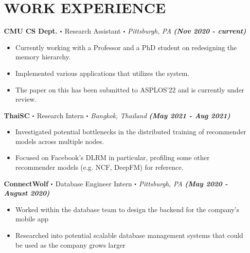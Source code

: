 \documentclass[10pt]{article}
\newcommand\sbullet[1][.5]{\mathbin{\vcenter{\hbox{\scalebox{#1}{$\bullet$}}}}}
\begin{document}
  \section*{\large \textcolor{lighterB} {WORK EXPERIENCE}}
  \vspace*{-0.23cm}

  \textbf{\large CMU CS Dept. $\sbullet$} {\large Research Assistant $\sbullet$ \textit{Pittsburgh, PA} \hfill \textit{\textbf{(Nov 2020 - current)}}}

  \vspace*{-0.2cm}
  \begin{itemize}
    \itemsep-0.4em
    \item \textcolor{lighterG}{Currently working with a Professor and a PhD student on redesigning the memory hierarchy.}
    \item \textcolor{lighterG}{Implemented various applications that utilizes the system.}
    \item \textcolor{lighterG}{The paper on this has been submitted to ASPLOS'22 and is currently under review.}
  \end{itemize}

  \textbf{\large ThaiSC $\sbullet$} {\large Research Intern $\sbullet$ \textit{Bangkok, Thailand} \hfill \textit{\textbf{(May 2021 - Aug 2021)}}}

  \vspace*{-0.2cm}
  \begin{itemize}
    \itemsep-0.4em
    \item \textcolor{lighterG}{Investigated potential bottlenecks in the distributed training of recommender models across multiple nodes.}
    \item \textcolor{lighterG}{Focused on Facebook's DLRM in particular, profiling some other recommender models (e.g. NCF, DeepFM) for reference.}
  \end{itemize}

  \textbf{\large ConnectWolf $\sbullet$} {\large Database Engineer Intern $\sbullet$ \textit{Pittsburgh, PA} \hfill \textit{\textbf{(May 2020 - August 2020)}}}

  \vspace*{-0.2cm}
  \begin{itemize}
    \itemsep-0.4em
    \item \textcolor{lighterG}{Worked within the database team to design the backend for the company's mobile app}
    \item \textcolor{lighterG}{Researched into potential scalable database management systems that could be used as the company grows larger}
  \end{itemize}
\end{document}
